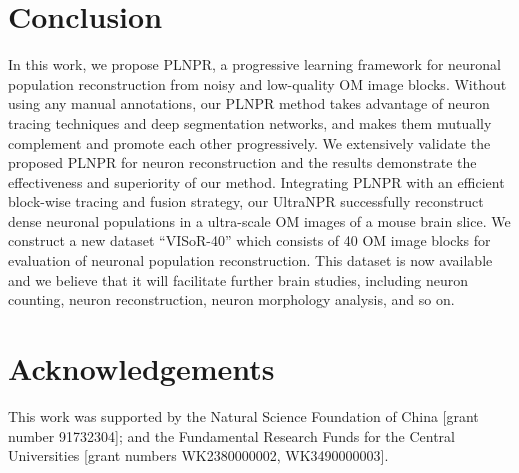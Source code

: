 \documentclass[times,twocolumn,final]{elsarticle}
\begin{document}





\section{Conclusion}
\label{sec:conclusion}
In this work, we propose PLNPR, a progressive learning framework for neuronal population reconstruction from noisy and low-quality OM image blocks.
Without using any manual annotations, our PLNPR method takes advantage of neuron tracing techniques and deep segmentation networks, and makes them mutually complement and promote each other progressively.
We extensively validate the proposed PLNPR for neuron reconstruction and the results demonstrate the effectiveness and superiority of our method.
Integrating PLNPR with an efficient block-wise tracing and fusion strategy, our UltraNPR successfully reconstruct dense neuronal populations in a ultra-scale OM images of a mouse brain slice.
%
We construct a new dataset ``VISoR-40'' which consists of 40 OM image blocks for evaluation of neuronal population reconstruction.
This dataset is now available and we believe that it will facilitate further brain studies, including neuron counting, neuron reconstruction, neuron morphology analysis, and so on.

\section*{Acknowledgements}
This work was supported by the Natural Science Foundation of China [grant number 91732304]; and the Fundamental Research Funds for the Central Universities [grant numbers WK2380000002, WK3490000003].
 


\end{document}
